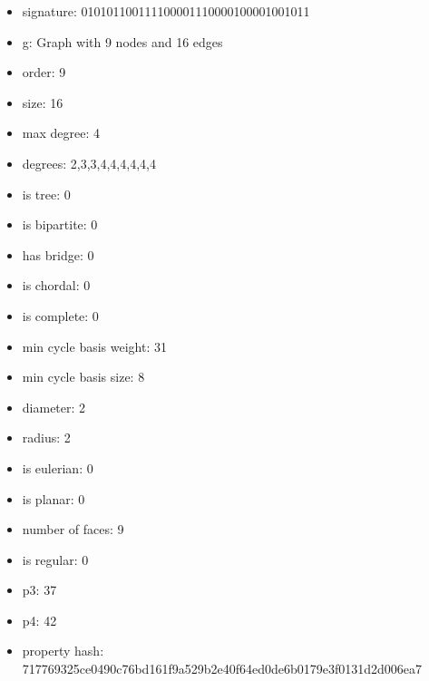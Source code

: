 \newpage
\begin{figure}
\end{figure}
\begin{itemize}
\item signature: 010101100111100001110000100001001011
\item g: Graph with 9 nodes and 16 edges
\item order: 9
\item size: 16
\item max degree: 4
\item degrees: 2,3,3,4,4,4,4,4,4
\item is tree: 0
\item is bipartite: 0
\item has bridge: 0
\item is chordal: 0
\item is complete: 0
\item min cycle basis weight: 31
\item min cycle basis size: 8
\item diameter: 2
\item radius: 2
\item is eulerian: 0
\item is planar: 0
\item number of faces: 9
\item is regular: 0
\item p3: 37
\item p4: 42
\item property hash: 717769325ce0490c76bd161f9a529b2e40f64ed0de6b0179e3f0131d2d006ea7
\end{itemize}
